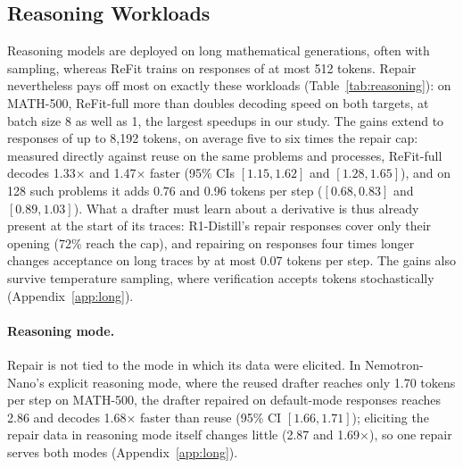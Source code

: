 \documentclass[11pt]{article}
\newcommand{\refit}{ReFit}
\newcommand{\refitF}{ReFit-full}
\begin{document}
\subsection{Reasoning Workloads}
\label{sec:reasoning}

Reasoning models are deployed on long mathematical generations, often with sampling, whereas \refit{} trains on responses of at most 512 tokens.
Repair nevertheless pays off most on exactly these workloads (Table~\ref{tab:reasoning}): on MATH-500, \refitF{} more than doubles decoding speed on both targets, at batch size 8 as well as 1, the largest speedups in our study.
The gains extend to responses of up to 8,192 tokens, on average five to six times the repair cap: measured directly against reuse on the same problems and processes, \refitF{} decodes 1.33$\times$ and 1.47$\times$ faster (95\% CIs $[1.15, 1.62]$ and $[1.28, 1.65]$), and on 128 such problems it adds 0.76 and 0.96 tokens per step ($[0.68, 0.83]$ and $[0.89, 1.03]$).
What a drafter must learn about a derivative is thus already present at the start of its traces: R1-Distill's repair responses cover only their opening (72\% reach the cap), and repairing on responses four times longer changes acceptance on long traces by at most 0.07 tokens per step.
The gains also survive temperature sampling, where verification accepts tokens stochastically (Appendix~\ref{app:long}).

\paragraph{Reasoning mode.}
Repair is not tied to the mode in which its data were elicited.
In Nemotron-Nano's explicit reasoning mode, where the reused drafter reaches only 1.70 tokens per step on MATH-500, the drafter repaired on default-mode responses reaches 2.86 and decodes 1.68$\times$ faster than reuse (95\% CI $[1.66, 1.71]$); eliciting the repair data in reasoning mode itself changes little (2.87 and 1.69$\times$), so one repair serves both modes (Appendix~\ref{app:long}).
\end{document}
